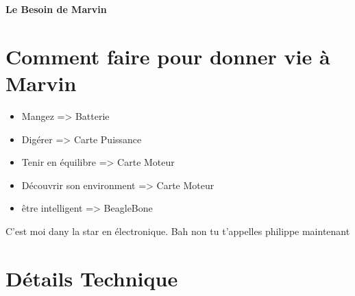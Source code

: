 \documentclass[10pt,a4paper]{article}
\begin{document}
{\bf Le Besoin de Marvin} 

\section{Comment faire pour donner vie à Marvin}

\begin{itemize}
\item Mangez => Batterie
\item Digérer => Carte Puissance
\item Tenir en équilibre => Carte Moteur
\item Découvrir son environment => Carte Moteur
\item être intelligent => BeagleBone
\end{itemize}

C'est moi dany la star en électronique.
Bah non tu t'appelles philippe maintenant


\section{Détails Technique}
\end{document}
